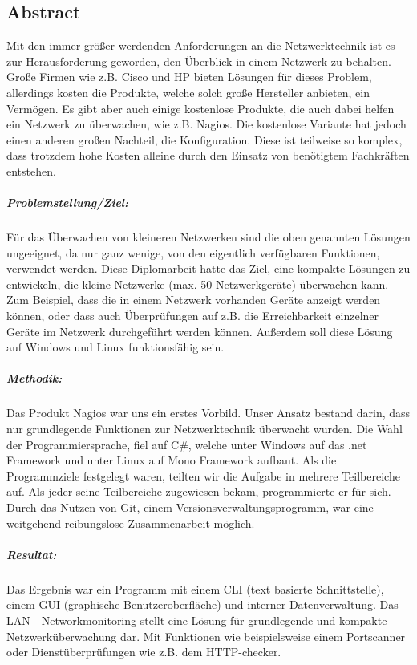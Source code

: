 \documentclass[12pt,a4paper]{report}
\begin{document}
\begin{onehalfspace}
\chapter{Abstract}
Mit den immer größer werdenden Anforderungen an die Netzwerktechnik ist es zur Herausforderung geworden, den Überblick in einem Netzwerk zu behalten. Große Firmen wie z.B. Cisco und HP bieten Lösungen für dieses Problem, allerdings kosten die Produkte, welche solch große Hersteller anbieten, ein Vermögen. Es gibt aber auch einige kostenlose Produkte, die auch dabei helfen ein Netzwerk zu überwachen, wie z.B. Nagios. Die kostenlose Variante hat jedoch einen anderen großen Nachteil, die Konfiguration. Diese ist teilweise so komplex, dass trotzdem hohe Kosten alleine durch den Einsatz von benötigtem Fachkräften entstehen.
\paragraph{Problemstellung/Ziel:} Für das Überwachen von kleineren Netzwerken sind die oben genannten Lösungen ungeeignet, da nur ganz wenige, von den eigentlich verfügbaren Funktionen, verwendet werden. Diese Diplomarbeit hatte das Ziel, eine kompakte Lösungen zu entwickeln, die kleine Netzwerke (max. 50 Netzwerkgeräte) überwachen kann. Zum Beispiel, dass die in einem Netzwerk vorhanden Geräte anzeigt werden können, oder dass auch Überprüfungen auf z.B. die Erreichbarkeit einzelner Geräte im Netzwerk durchgeführt werden können. Außerdem soll diese Lösung auf Windows und Linux funktionsfähig sein.
\paragraph{Methodik:} Das Produkt Nagios war uns ein erstes Vorbild. Unser Ansatz bestand darin, dass nur grundlegende Funktionen zur Netzwerktechnik überwacht wurden. Die Wahl der Programmiersprache, fiel auf C\#, welche unter Windows auf das .net Framework und unter Linux auf Mono Framework aufbaut. Als die Programmziele festgelegt waren, teilten wir die Aufgabe in mehrere Teilbereiche auf. Als jeder seine Teilbereiche zugewiesen bekam, programmierte er für sich. Durch das Nutzen von Git, einem Versionsverwaltungsprogramm, war eine weitgehend reibungslose Zusammenarbeit möglich.
\paragraph{Resultat:} Das Ergebnis war ein Programm mit einem CLI (text basierte Schnittstelle), einem GUI (graphische Benutzeroberfläche) und interner Datenverwaltung. Das LAN - Networkmonitoring stellt eine Lösung für grundlegende und kompakte Netzwerküberwachung dar. Mit Funktionen wie beispielsweise einem Portscanner oder Dienstüberprüfungen wie z.B. dem HTTP-checker.

\end{onehalfspace}
\end{document}
